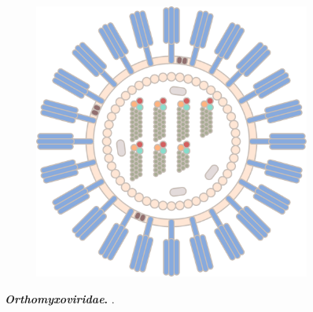 \begin{figure}
\begin{subfigure}[b]{0.475\textwidth}
        \includegraphics[width=\textwidth]{Graphics/Influenza_B.pdf}
    \end{subfigure}
    \caption[\textit{Orthomyxoviridae}]{\textbf{\textit{Orthomyxoviridae}.} .}
    \label{fig:Orthomyxoviridae}
\end{figure}

